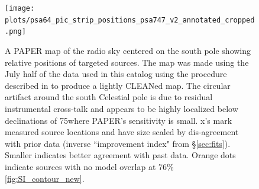 \documentclass[preprint]{aastex}
\begin{document}



\begin{figure}
\texttt{[image: plots/psa64\_pic\_strip\_positions\_psa747\_v2\_annotated\_cropped.png]}
\caption{
A PAPER map of the radio sky centered on the south pole showing relative positions of targeted sources. The map was made using the July half of the
data used in this catalog using the procedure described in \citet{Jacobs:2011p8438} to produce a lightly CLEANed map. The circular artifact around the south Celestial pole is due to residual instrumental cross-talk and appears to be highly localized below declinations of 75\arcdeg where PAPER's sensitivity is small.  x's mark measured source locations and have size
scaled by dis-agreement with prior data (inverse ``improvement index" from 
\S\ref{sec:fits}). Smaller indicates better agreement with past data.  Orange dots indicate sources with no model overlap at 76\% \ref{fig:SI_contour_new}. 
\label{fig:error_map}
}
\end{figure}


\end{document}
